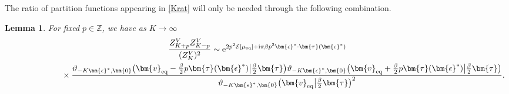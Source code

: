 \documentclass[10pt,a4paper]{amsart}
\numberwithin{equation}{section}
\newtheorem{Lemma}[Theorem]{Lemma}
\begin{document}
The ratio of partition functions appearing in \eqref{Krat} will only be needed through the following combination.
\begin{Lemma}\label{ratioZ}
 For fixed $p \in \mathbb{Z}$, we have as $K \rightarrow \infty$
 \begin{gather*}
	 \frac{Z_{K + p}^{V}Z_{K - p}^{V}}{(Z_K^V)^2}\sim{\rm e}^{2p^2 \mathcal{E}[\mu_{{\rm eq}}] + {\rm i}\pi \beta p^2 \bm{\epsilon}^* \cdot \bm{\tau}(\bm{\epsilon}^*)} \\
\hphantom{\frac{Z_{K + p}^{V}Z_{K - p}^{V}}{(Z_K^V)^2}\sim}{}\times\frac{\vartheta_{-K\bm{\epsilon}^*,\bm{0}}\bigl(\bm{v}_{{\rm eq}} - \tfrac{\beta}{2}p\bm{\tau}(\bm{\epsilon}^*)\big|\tfrac{\beta}{2}\bm{\tau}\bigr) \vartheta_{-K\bm{\epsilon}^*,\bm{0}}\bigl(\bm{v}_{{\rm eq}} + \tfrac{\beta}{2} p \bm{\tau}(\bm{\epsilon}^*)\big|\tfrac{\beta}{2}\bm{\tau}\bigr)}{\vartheta_{-K\bm{\epsilon}^*,\bm{0}}\bigl(\bm{v}_{{\rm eq}}\big|\frac{\beta}{2}\bm{\tau}\bigr)^{2}}.
 \end{gather*}
\end{Lemma}
\end{document}
